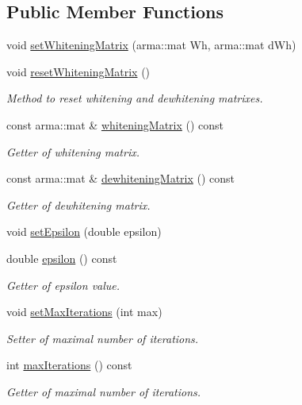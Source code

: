 \subsection*{Public Member Functions}
\begin{DoxyCompactItemize}
\item 
void \hyperlink{classmbica_1_1_fast_i_c_a__impl_acb8a677bfc9539222d05eab68107277c}{setWhiteningMatrix} (arma::mat Wh, arma::mat dWh)
\item 
void \hyperlink{classmbica_1_1_fast_i_c_a__impl_a7bf245e4d88340d45b3ad1319e00724e}{resetWhiteningMatrix} ()
\begin{DoxyCompactList}\small\item\em Method to reset whitening and dewhitening matrixes. \item\end{DoxyCompactList}\item 
const arma::mat \& \hyperlink{classmbica_1_1_fast_i_c_a__impl_a62157ddfa4b2a1fc86a4e490be53a949}{whiteningMatrix} () const 
\begin{DoxyCompactList}\small\item\em Getter of whitening matrix. \item\end{DoxyCompactList}\item 
const arma::mat \& \hyperlink{classmbica_1_1_fast_i_c_a__impl_a820ef876ee9adf2c59102109e8eab248}{dewhiteningMatrix} () const 
\begin{DoxyCompactList}\small\item\em Getter of dewhitening matrix. \item\end{DoxyCompactList}\item 
void \hyperlink{classmbica_1_1_fast_i_c_a__impl_a5dede124e00318eda54452811e1c7ab1}{setEpsilon} (double epsilon)
\item 
double \hyperlink{classmbica_1_1_fast_i_c_a__impl_a7e8502efec4f08a8eb2be77bca7e0c91}{epsilon} () const 
\begin{DoxyCompactList}\small\item\em Getter of epsilon value. \item\end{DoxyCompactList}\item 
void \hyperlink{classmbica_1_1_fast_i_c_a__impl_a1468646012fcdc60f70e3c632a1b9450}{setMaxIterations} (int max)
\begin{DoxyCompactList}\small\item\em Setter of maximal number of iterations. \item\end{DoxyCompactList}\item 
int \hyperlink{classmbica_1_1_fast_i_c_a__impl_a47416533583d0e17176b6ef82316658a}{maxIterations} () const 
\begin{DoxyCompactList}\small\item\em Getter of maximal number of iterations. \item\end{DoxyCompactList}\end{DoxyCompactItemize}
